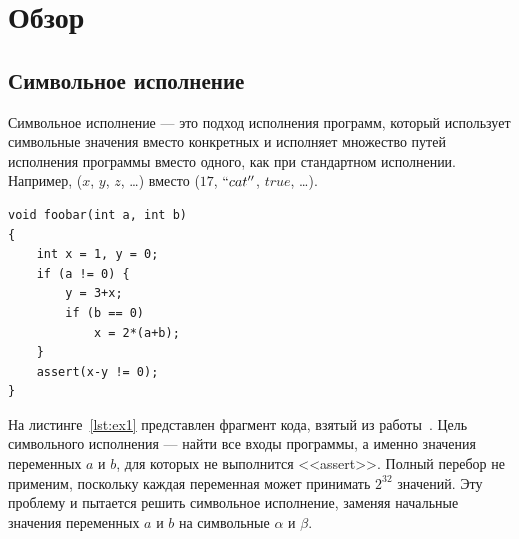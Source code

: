\section{Обзор}
\subsection{Символьное исполнение}
Символьное исполнение --- это подход исполнения программ, который использует символьные значения вместо конкретных и исполняет множество путей исполнения программы вместо одного, как при стандартном исполнении. Например, ($x$, $y$, $z$, \dots) вместо ($17$, $``cat''$, $true$, \dots). 

\begin{lstlisting}[caption={Программа для иллюстрации символьного исполнения},captionpos=b,label={lst:ex1}]
void foobar(int a, int b)
{
    int x = 1, y = 0;
    if (a != 0) {
        y = 3+x;
        if (b == 0)
            x = 2*(a+b);
    }
    assert(x-y != 0);
}
\end{lstlisting}
На листинге~\ref{lst:ex1} представлен фрагмент кода, взятый из работы~\cite{baldoni2018survey}.
Цель символьного исполнения --- найти все входы программы, а именно значения переменных $a$ и $b$, для которых не выполнится <<assert>>. Полный перебор не применим, поскольку каждая переменная может принимать $2^{32}$ значений.
Эту проблему и пытается решить символьное исполнение, заменяя начальные значения переменных $a$ и $b$ на символьные $\alpha$ и $\beta$.

